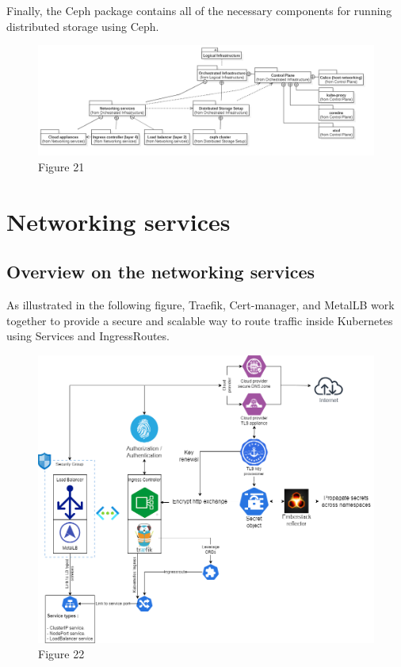 Finally, the Ceph package contains all of the necessary components for running distributed storage using Ceph.

\begin{figure}[H]\centering
\includegraphics[width=1.0\textwidth,angle=00]{assets/f21.png}
\caption{ Figure 21}
\label{fig:f21}
\end{figure}

\section{Networking services}

\subsection{Overview on the networking services}

As illustrated in the following figure, Traefik, Cert-manager, and MetalLB work together to provide a secure and scalable way to route traffic inside Kubernetes using Services and IngressRoutes.

\begin{figure}[H]\centering
\includegraphics[width=1.0\textwidth,angle=00]{assets/f22.png}
\caption{Figure 22 }
\label{fig:f22}
\end{figure}


